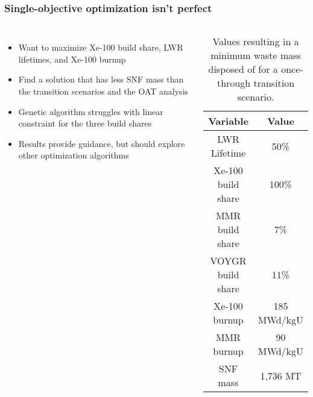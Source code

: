 \begin{frame}
    \frametitle{Single-objective optimization isn't perfect}
    \begin{columns}
        \column[t]{5cm}
        \begin{itemize}
            \item Want to maximize Xe-100 build share, LWR lifetimes,
                  and Xe-100 burnup
            \item Find a solution that has less SNF mass than the 
                  transition scenarios and the OAT analysis
            \item<2-> Genetic algorithm struggles with linear constraint for 
                  the three build shares
            \item<3-> Results provide guidance, but should explore 
                  other optimization algorithms
        \end{itemize}

        \column[t]{5.5cm}
        \begin{table}[h!]
            \centering 
            \caption{Values resulting in a minimum waste mass disposed of for 
                      a once-through transition scenario.}
            \label{tab:soga_ot_waste}
            \vspace{-0.5cm}
            \begin{tabular}{c c}
                \hline
                Variable & Value \\
                \hline
                LWR Lifetime & 50\%\\
                Xe-100 build share & 100\%\\
                MMR build share & 7\%\\
                VOYGR build share & 11\%\\
                Xe-100 burnup & 185 MWd/kgU\\
                MMR burnup & 90 MWd/kgU\\
                \hline
                SNF mass & 1,736 MT \\
                \hline
            \end{tabular}
        \end{table}
    \end{columns}
    
\end{frame}